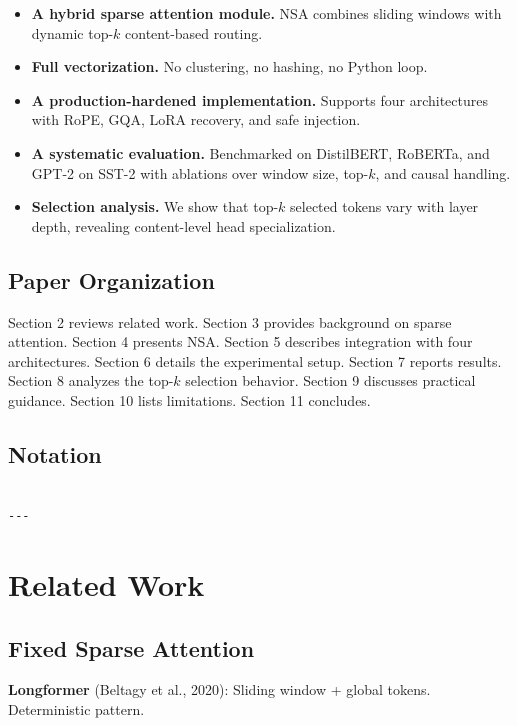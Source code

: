 \begin{itemize}
\item \textbf{A hybrid sparse attention module.} NSA combines sliding windows with
  dynamic top-$k$ content-based routing.
\item \textbf{Full vectorization.} No clustering, no hashing, no Python loop.
\item \textbf{A production-hardened implementation.} Supports four architectures
  with RoPE, GQA, LoRA recovery, and safe injection.
\item \textbf{A systematic evaluation.} Benchmarked on DistilBERT, RoBERTa, and GPT-2
  on SST-2 with ablations over window size, top-$k$, and causal handling.
\item \textbf{Selection analysis.} We show that top-$k$ selected tokens vary with
  layer depth, revealing content-level head specialization.

\end{itemize}
\subsection{Paper Organization}

Section 2 reviews related work. Section 3 provides background on sparse 
attention. Section 4 presents NSA. Section 5 describes integration with four 
architectures. Section 6 details the experimental setup. Section 7 reports 
results. Section 8 analyzes the top-$k$ selection behavior. Section 9 
discusses practical guidance. Section 10 lists limitations. Section 11 
concludes.



\subsection{Notation}

\begin{lstlisting}

---
\end{lstlisting}


\section{Related Work}

\subsection{Fixed Sparse Attention}

\textbf{Longformer} (Beltagy et al., 2020): Sliding window + global tokens. 
Deterministic pattern.

